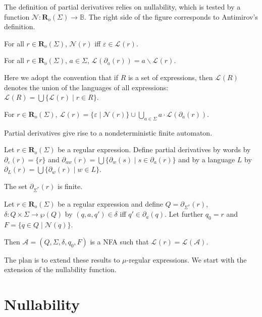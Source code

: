 \documentclass[runningheads, envcountsame, a4paper]{llncs}
\newcommand\LQ[1]{#1\backslash}
\newcommand\Power{\wp}
\newcommand\bool{\mathbb{B}}
\newcommand\pderiv[3][{}]{\partial^{#1}_{#3}(#2)}
\newcommand\Lang[1][{}]{\mathcal{L}^{#1}}
\renewcommand\L\Lang
\newcommand\calA{\mathcal{A}}
\newcommand\Reg{\mathbf{R}}
\newcommand\Null{\mathcal{N}}
\begin{document}
The definition of partial derivatives relies on nullability, which is tested by a function $\Null
: \Reg_o (\Sigma) \to \bool$. The right side of the figure corresponds to
Antimirov's definition.
\begin{lemma}
  For all $r\in\Reg_o (\Sigma)$, $\Null (r)$ iff $\varepsilon \in \Lang (r)$.
\end{lemma}
\begin{theorem}
  For all $r \in \Reg_o (\Sigma)$, $a\in\Sigma$,
  $\Lang ( \pderiv{r}{a}) = \LQ{a} \Lang (r)$.
\end{theorem}
Here we adopt the convention that if $R$ is a set of expressions, then
$\Lang ( R)$ denotes the union of the languages of all expressions:
$\Lang ( R) = \bigcup \{ \Lang (r) \mid r\in R\}$.
\begin{theorem}[Expansion]
  For $r \in \Reg_o (\Sigma)$, $\L (r) = \{ \varepsilon \mid \Null
  (r) \} \cup \bigcup_{a\in\Sigma} a\cdot \Lang (\pderiv{r}{a})$.
\end{theorem}

Partial derivatives give rise to a nondeterministic finite automaton.

\begin{theorem}
  Let $r\in \Reg_o (\Sigma)$ be a regular expression.
  Define partial derivatives by words by $\pderiv{r}{\varepsilon} =
  \{r\}$ and $\pderiv{r}{aw} = \bigcup \{ \pderiv{s}{w} \mid s \in
  \pderiv{r}{a} \}$ and by a language $L$ by $\pderiv{r}{L} = \bigcup
  \{ \pderiv{r}{w} \mid w\in L\}$.

  The set $\pderiv{r}{\Sigma^*}$ is finite.
\end{theorem}

\begin{theorem}
  Let $r\in \Reg_o (\Sigma)$ be a regular expression and define
  $Q = \pderiv{r}{\Sigma^*}$,
  $\delta : Q \times \Sigma \to \Power (Q)$ by  $(q, a, q') \in
  \delta$ iff $q' \in\pderiv{q}{a}$.
  Let further $q_0 = r$ and $F = \{ q \in Q \mid \Null (q) \}$.

  Then  $\calA = (Q, \Sigma, \delta, q_0, F)$ is a NFA such that 
  $\L (r)= \L (\calA)$.
\end{theorem}

The plan is to extend these results to $\mu$-regular expressions. 
We start with the extension of the nullability function.

\section{Nullability}
\label{sec:nullability}
\end{document}
